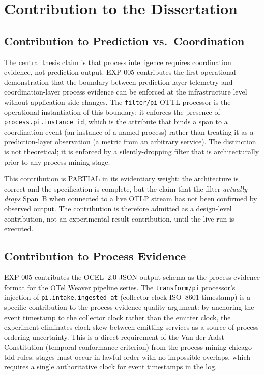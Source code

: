 \section{Contribution to the Dissertation}
\label{sec:otel-weaver-exp-005-collector-to-intake-contribution}

\subsection{Contribution to Prediction vs.~Coordination}
\label{sec:otel-weaver-exp-005-collector-to-intake-contribution-prediction}

The central thesis claim is that process intelligence requires coordination evidence, not
prediction output. EXP-005 contributes the first operational demonstration that the boundary
between prediction-layer telemetry and coordination-layer process evidence can be enforced
at the infrastructure level without application-side changes. The \texttt{filter/pi} OTTL
processor is the operational instantiation of this boundary: it enforces the presence of
\texttt{process.pi.instance\_id}, which is the attribute that binds a span to a coordination
event (an instance of a named process) rather than treating it as a prediction-layer
observation (a metric from an arbitrary service). The distinction is not theoretical; it is
enforced by a silently-dropping filter that is architecturally prior to any process mining
stage.

This contribution is PARTIAL in its evidentiary weight: the architecture is correct and the
specification is complete, but the claim that the filter \textit{actually drops} Span~B
when connected to a live OTLP stream has not been confirmed by observed output. The
contribution is therefore admitted as a design-level contribution, not an experimental-result
contribution, until the live run is executed.

\subsection{Contribution to Process Evidence}
\label{sec:otel-weaver-exp-005-collector-to-intake-contribution-process-evidence}

EXP-005 contributes the OCEL~2.0 JSON output schema as the process evidence format for the
OTel Weaver pipeline series. The \texttt{transform/pi} processor's injection of
\texttt{pi.intake.ingested\_at} (collector-clock ISO~8601 timestamp) is a specific
contribution to the process evidence quality argument: by anchoring the event timestamp to
the collector clock rather than the emitter clock, the experiment eliminates clock-skew
between emitting services as a source of process ordering uncertainty. This is a direct
requirement of the Van der Aalst Constitution (temporal conformance criterion) from the
process-mining-chicago-tdd rules: stages must occur in lawful order with no impossible
overlaps, which requires a single authoritative clock for event timestamps in the log.


